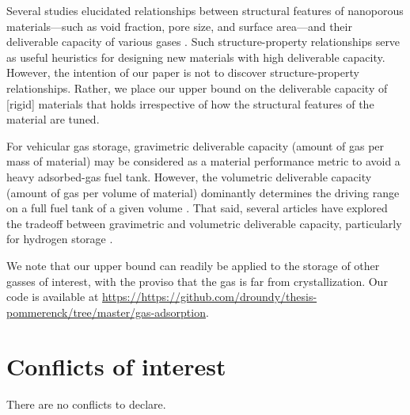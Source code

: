 \documentclass[pre,twocolumn]{revtex4-2}
\newcommand\startreferees[1]{\cbstart \noindent\textit{\color{red}%
[\textbf{To referees:} #1]}

}
\newcommand\donereferees{\cbend}
\begin{document}
Several studies elucidated relationships between structural features of
nanoporous materials---such as void fraction, pore size, and surface area---and
their deliverable capacity of various gases
\cite{gomez2014exploring,ahmed2019exceptional,simon2015materials,moghadam2018computer,Tong2018}.
Such structure-property relationships serve as useful heuristics for designing
new materials with high deliverable capacity. However, the intention of our
paper is not to discover structure-property relationships. Rather, we place our
upper bound on the deliverable capacity of [rigid] materials that holds
irrespective of how the structural features of the material are tuned.



For vehicular gas storage, gravimetric deliverable capacity (amount of gas per
mass of material) may be considered as a material performance metric to avoid a
heavy adsorbed-gas fuel tank. However, the volumetric deliverable capacity
(amount of gas per volume of material) dominantly determines the driving range
on a full fuel tank of a given volume \cite{mason2014evaluating}. That said,
several articles have explored the tradeoff between gravimetric and volumetric
deliverable capacity, particularly for hydrogen storage
\cite{gomez2017understanding,chen2020balancing,goldsmith2013theoretical,ahmed2021predicting}.



We note that our upper bound can readily be applied to the storage of other
gasses of interest, with the proviso that the gas is far from crystallization.
Our code is available at \href{https://https://github.com/droundy/thesis-pommerenck/tree/master/gas-adsorption}{https://https://github.com/droundy/thesis-pommerenck/tree/master/gas-adsorption}.

\section*{Conflicts of interest}
There are no conflicts to declare.


\end{document}
